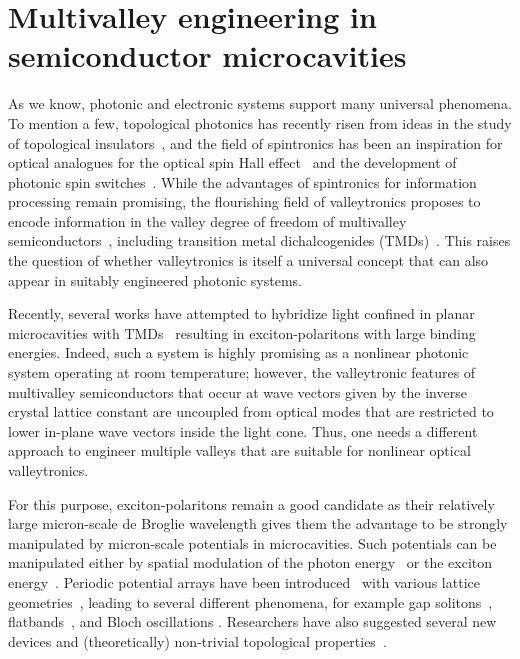 \section{Multivalley engineering in semiconductor microcavities}\label{Ch2}
%
%
As we know, photonic and electronic systems support many universal phenomena.
To mention a few, topological photonics has recently risen from ideas in the study of topological insulators~\cite{Lu:2014aa}, and the field of spintronics has been an inspiration for optical analogues for the optical spin Hall effect~\cite{Leyder:2007aa} and the development of photonic spin switches~\cite{Lagoudakis:2002aa,Amo:2010aa}.
While the advantages of spintronics for information processing remain promising, the flourishing field of valleytronics proposes to encode information in the valley degree of freedom of multivalley semiconductors~\cite{Behnia:2012aa,Nebel:2013aa}, including transition metal dichalcogenides (TMDs)~\cite{Xu:2014aa,Jones:2014aa,He:2014aa,Chernikov:2014aa}.
This raises the question of whether valleytronics is itself a universal concept that can also appear in suitably engineered photonic systems.

Recently, several works have attempted to hybridize light confined in planar microcavities with TMDs~\cite{Vasilevskiy:2015aa,Lundt:2016aa} resulting in exciton-polaritons with large binding energies.
Indeed, such a system is highly promising as a nonlinear photonic system operating at room temperature; however, the valleytronic features of multivalley semiconductors that occur at wave vectors given by the inverse crystal lattice constant are uncoupled from optical modes that are restricted to lower in-plane wave vectors inside the light cone.
Thus, one needs a different approach to engineer multiple valleys that are suitable for nonlinear optical valleytronics.

For this purpose, exciton-polaritons remain a good candidate as their relatively large micron-scale de Broglie wavelength gives them the advantage to be strongly manipulated by micron-scale potentials in microcavities.
Such potentials can be manipulated either by spatial modulation of the photon energy~\cite{Kaitouni:2006aa,Lai:2007aa} or the exciton energy~\cite{Balili:2007aa,Amo:2010aa,Assmann:2012aa,Cristofolini:2013aa,Askitopoulos:2013aa}.
Periodic potential arrays have been introduced~\cite{Lai:2007aa,Cerda-Mendez:2010aa} with various lattice geometries~\cite{Kim:2013aa,Cerda-Mendez:2013aa,Winkler:2016aa}, leading to several different phenomena, for example gap solitons~\cite{Ostrovskaya:2013aa,Tanese:2013aa}, flatbands~\cite{Jacqmin:2014aa}, and Bloch oscillations \cite{Flayac:2011aa,Flayac:2013aa}.
Researchers have also suggested several new devices \cite{Flayac:2013aa,Marsault:2015aa} and (theoretically) non-trivial topological properties~\cite{Karzig:2015aa,Nalitov:2015aa,Bardyn:2015aa,Bardyn:2016aa}.

